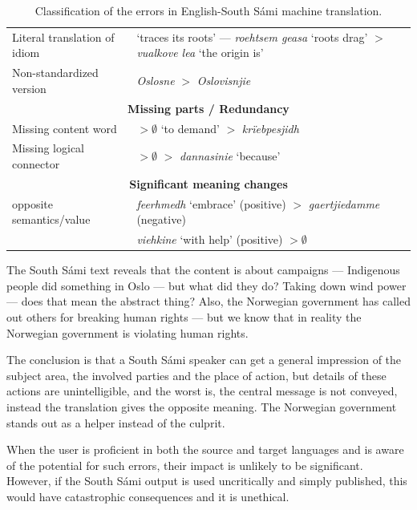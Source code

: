 \documentclass[free]{flammie}
\begin{document}
\begin{table}[htb]
\begin{center}
\begin{tabularx}{0.8\pagewidth}{lX}
Literal translation of idiom & `traces its roots' --- \textit{roehtsem geasa} `roots drag' $>$  \textit{vualkove lea} `the origin is' \\
Non-standardized version &	\textit{Oslosne} $>$ \textit{Oslovisnjie} \\
\midrule
\multicolumn{2}{|c|}{\bf Missing parts / Redundancy} \\
\midrule
Missing content word & $>\emptyset$ `to demand' $>$ \textit{krïebpesjidh}\\
Missing logical connector & $>\emptyset$ $>$ \textit{dannasinie} `because' \\
\midrule
\multicolumn{2}{|c|}{\bf Significant meaning changes} \\
\midrule
opposite semantics/value & \textit{feerhmedh} `embrace' (positive) $>$ \textit{gaertjiedamme} (negative) \\
& \textit{viehkine} `with help' (positive) $>\emptyset$  \\
\bottomrule
\end{tabularx}
\end{center}
\caption{\label{mterr} Classification of the errors in English-South Sámi machine translation.}
\end{table}

The South Sámi text reveals that the content is about campaigns --- Indigenous
people did something in Oslo --- but what did they do? Taking down wind power
--- does that mean the abstract thing? Also, the Norwegian government has called
out others for breaking human rights --- but we know that in reality the
Norwegian government is violating human rights.

The conclusion is that a South Sámi speaker can get a general impression of the
subject area, the involved parties and the place of action, but details of these
actions are unintelligible, and the worst is, the central message is not
conveyed, instead the translation gives the opposite meaning. The Norwegian
government stands out as a helper instead of the culprit.

When the user is proficient in both the source and target languages and is aware
of the potential for such errors, their impact is unlikely to be significant.
However, if the South Sámi output is used uncritically and simply published,
this would have catastrophic consequences and it is unethical.
\end{document}
